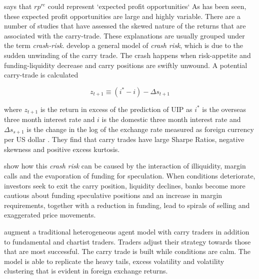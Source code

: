 \documentclass[12pt, a4paper, oneside]{article}\usepackage[]{graphicx}\usepackage[]{color}
\begin{document}
\citet[p.148]{Engel1996} says that $rp^{re}$ could represent `expected profit opportunities` As has been seen, these expected profit opportunities are large and highly variable.  There are a number of studies that have assessed the skewed nature of the returns that are associated with the carry-trade.  These explanations are usually grouped under the term \emph{crash-risk}.  \citet{BrunnermeierCarry} develop a general model of \emph{crash risk}, which is due to the sudden unwinding of the carry trade.  The crash happens when risk-appetite and funding-liquidity decrease and carry positions are swiftly unwound. A potential carry-trade is calculated 

\begin{equation}\label{eqref:carry}
z_{t+1} \equiv (i^* - i) -\Delta s_{t+1}
\end{equation}

where $z_{t+1}$ is the return in excess of the prediction of UIP as $i^*$ is the overseas three  month interest rate and $i$ is the domestic three month interest rate and $\Delta s_{s+1}$ is the change in the log of the exchange rate measured as foreign currency per US dollar \citet[pp. 8-9]{BrunnermeierCarry}.   They find that carry trades have large Sharpe Ratios, negative skewness and positive excess kurtosis.  

\citet{BrunnermeierLiquidity} show how this \emph{crash risk} can be caused by the interaction of illiquidity, margin calls and the evaporation of funding for speculation.  When conditions deteriorate, investors seek to exit the carry position, liquidity declines, banks become more cautious about funding speculative positions and an increase in margin requirements, together with a reduction in funding, lead to spirals of selling and exaggerated price movements.

 \citet{SpronkEER} augment a traditional heterogeneous agent model with carry traders in addition to fundamental and chartist traders.  Traders adjust their strategy towards those that are most successful. The carry trade is built while conditions are calm.    The model is able to replicate the heavy tails, excess volatility and volatility clustering that is evident in foreign exchange returns.  
\end{document}
